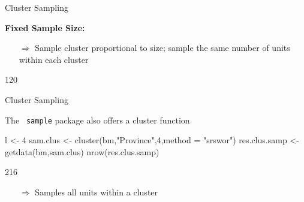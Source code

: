 \documentclass[11pt,german,hideothersubsections]{beamer}
\newcommand{\R}[1]{{\tt \color{blue}  #1}}
\begin{document}
\begin{frame}[fragile]{Cluster Sampling}
\vspace{-.35cm}
\footnotesize{
\begin{center}
\textbf{Fixed Sample Size:}
\end{center}
\begin{itemize}
\item[$\Rightarrow$] Sample cluster proportional to size; sample the same number of units within each cluster
\end{itemize}
\begin{Schunk}
\begin{Soutput}
[1] 120
\end{Soutput}
\end{Schunk}
}
\end{frame}
\begin{frame}[fragile]{Cluster Sampling}
\footnotesize{
The \R{sample} package also offers a cluster function
\begin{Schunk}
\begin{Sinput}
 l <- 4
 sam.clus <- cluster(bm,"Province",4,method = "srswor")
 res.clus.samp <- getdata(bm,sam.clus)
 nrow(res.clus.samp)
\end{Sinput}
\begin{Soutput}
[1] 216
\end{Soutput}
\end{Schunk}
\begin{itemize}
\item[$\Rightarrow$] Samples all units within a cluster
\end{itemize}
}
\end{frame}
\end{document}
